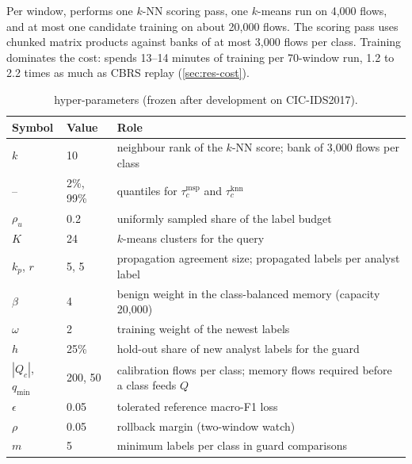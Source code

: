 Per window, \nova{} performs one $k$-NN scoring pass, one $k$-means run on 4{,}000 flows, and at most one candidate
training on about 20{,}000 flows. The scoring pass uses chunked matrix products against banks of at most 3{,}000
flows per class. Training dominates the cost: \nova{} spends 13--14 minutes of training per 70-window run, 1.2 to 2.2
times as much as CBRS replay (\cref{sec:res-cost}).

\begin{table}[t]
\centering
\caption{\nova{} hyper-parameters (frozen after development on CIC-IDS2017).}
\label{tab:hyper}
\small
\begin{tabular}{@{}llp{}@{}}
\toprule
Symbol & Value & Role \\
\midrule
$k$ & 10 & neighbour rank of the $k$-NN score; bank of 3{,}000 flows per class \\
-- & 2\%, 99\% & quantiles for $\tau^{\text{msp}}_c$ and $\tau^{\text{knn}}_c$ \\
$\rho_u$ & 0.2 & uniformly sampled share of the label budget \\
$K$ & 24 & $k$-means clusters for the query \\
$k_p$, $r$ & 5, 5 & propagation agreement size; propagated labels per analyst label \\
$\beta$ & 4 & benign weight in the class-balanced memory (capacity 20{,}000) \\
$\omega$ & 2 & training weight of the newest labels \\
$h$ & 25\% & hold-out share of new analyst labels for the guard \\
$|Q_c|$, $q_{\min}$ & 200, 50 & calibration flows per class; memory flows required before a class feeds $Q$ \\
$\epsilon$ & 0.05 & tolerated reference macro-F1 loss \\
$\rho$ & 0.05 & rollback margin (two-window watch) \\
$m$ & 5 & minimum labels per class in guard comparisons \\
\bottomrule
\end{tabular}
\end{table}
